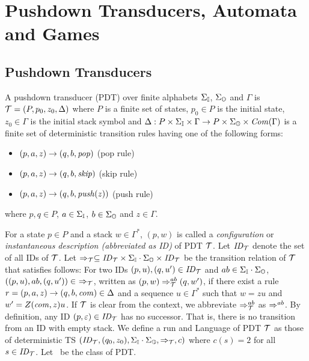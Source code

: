\section{Pushdown Transducers, Automata and Games}
\subsection{Pushdown Transducers}
\begin{definition}
A {pushdown transducer} (PDT)
over finite alphabets $\Sigma_{\mathbb{I}}$, $\Sigma_{\mathbb{O}}$ and $\Gamma$
is ${\cal T}=(P, p_0, z_0, \Delta)$ where
$P$ is a finite set of states,
$p_0\in P$ is the initial state,
$z_0\in \Gamma$ is the initial stack symbol and
$\Delta: P\times \Sigma_{\mathbb{I}} \times \Gamma \to P\times \Sigma_{\mathbb{O}} \times \mathit{Com}(\Gamma)$ is a finite set of deterministic transition rules having one of the following forms:
\begin{itemize}
\item $(p, a, z) \rightarrow (q, b, \mathit{pop})$ \quad (pop rule)
\item $(p, a, z) \rightarrow (q, b, \mathit{skip})$ \quad (skip rule)
\item $(p, a, z) \rightarrow (q, b, \mathit{push}(z))$ \quad (push rule)
\end{itemize}
where $p, q\in P$, $a\in\Sigma_{\mathbb{I}}$, $b\in\Sigma_{\mathbb{O}}$ and $z\in\Gamma$.
\end{definition}
\noindent
For a state $p\in P$ and
a stack $w \in \Gamma^*$,
$(p, w)$ is called
a {\em configuration} or {\em instantaneous description (abbreviated as ID)} of PDT ${\cal T}$. Let $\mathit{ID}_{\cal T}$ denote the set of all IDs of ${\cal T}$.
Let $\Rightarrow_{\cal T}\subseteq \mathit{ID}_{\cal T}\times \Sigma_{\mathbb{I}}\cdot\Sigma_{\mathbb{O}}\times \mathit{ID}_{\cal T}$ be the transition relation of ${\cal T}$ that satisfies follows:
For two IDs $(p, u), (q, u')\in \mathit{ID}_{\cal T}$ and $ab\in\Sigma_{\mathbb{I}}\cdot \Sigma_{\mathbb{O}}$,
$((p, u), ab, (q, u'))\in\ \Rightarrow_{\cal T}$,
written as $(p, w) \Rightarrow_{{\cal T}}^{ab} (q, w')$,
if there exist a rule $r=(p, a, z) \rightarrow (q, b, \mathit{com}) \in \Delta$ and a sequence $u\in \Gamma^*$ such that $w=zu$ and $w'=Z(\mathit{com},z)u$.
If ${\cal T}$ is clear from the context,
we abbreviate
$\Rightarrow_{{\cal T}}^{ab}$ as $\Rightarrow^{ab}$.
By definition, any ID $(p, \varepsilon)\in\mathit{ID}_{{\cal T}}$ has
no successor.
That is, there is no transition from an ID with empty stack.
We define a run and Language of PDT ${\cal T}$ as those of
deterministic TS $(\mathit{ID}_{\cal T}, (q_0,z_0), \Sigma_{\mathbb{I}}\cdot\Sigma_{\mathbb{O}}, \Rightarrow_{\cal T}, c)$ where $c(s)=2$ for all $s\in\mathit{ID}_{\cal T}$.
Let \PDT\ be the class of PDT.

